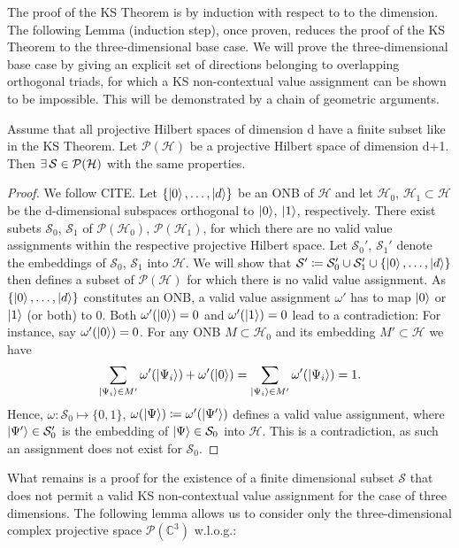 The proof of the KS Theorem is by induction with respect to to the dimension. The following Lemma (induction step), once proven, reduces the proof of the KS Theorem to the three-dimensional base case. We will prove the three-dimensional base case by giving an explicit set of directions belonging to overlapping orthogonal triads, for which a KS non-contextual value assignment can be shown to be impossible. This will be demonstrated by a chain of geometric arguments.

\begin{lemma}[CITE]\hfill\break
Assume that all projective Hilbert spaces of dimension d have a finite subset like in the KS Theorem. Let $\mathcal{P}(\mathcal{H})$ be a projective Hilbert space of dimension d+1. Then $\exists\thinspace\mathbb{\mathcal{S}\in\mathcal{P}}(\mathcal{H})$ with the same properties. 
\end{lemma}

\begin{proof}
We follow CITE. Let $\{\ket{0},\dots,\ket{d} \}$ be an ONB of $\mathcal{H}$ and let $\mathcal{H}_{0}$, $\mathcal{H}_{1}\subset\mathcal{H}$ be the d-dimensional subspaces orthogonal to $\ket{0}$, $\ket{1}$, respectively. There exist subets $\mathcal{S}_{0}$, $\mathcal{S}_{1}$ of $\mathcal{P}(\mathcal{H}_{0})$, $\mathcal{P}(\mathcal{H}_{1})$, for which there are no valid value assignments within the respective projective Hilbert space. Let $\mathcal{S}_{0}'$, $\mathcal{S}_{1}'$ denote the embeddings of $\mathcal{S}_{0}$, $\mathcal{S}_{1}$ into $\mathcal{H}$. We will show that $\mathcal{S}'\coloneqq\mathcal{S}_{0}'\cup\mathcal{S}_{1}'\cup\{\ket{0},\dots, \ket{d}\}$ then defines a subset of $\mathcal{P}(\mathcal{H})$ for which there is no valid value assignment. As $\{\ket{0},\dots,\ket{d} \}$ constitutes an ONB, a valid value assignment $\omega'$ has to map $\ket{0}$ or $\ket{1}$  (or both) to 0. Both $\omega'(\ket{0})=0$ and $\omega'(\ket{1})=0$ lead to a contradiction: For instance, say $\omega'(\ket{0})=0$. For any ONB $M\subset\mathcal{H}_{0}$ and its embedding $M'\subset\mathcal{H}$ we have
\begin{equation*}
\sum\limits _{\ket{\Psi_{i}}\in M'}\omega'(\left|\Psi_{i}\right\rangle )+\omega'(\ket{0} )=\sum\limits _{\ket{\Psi_{i}}\in M'}\omega'(\ket{\Psi_{i}})=1.     
\end{equation*}
Hence, $\omega:\mathcal{S}_{0}\mapsto\{0,1\}$, $\omega(\ket{\Psi} )\coloneqq\omega'(\ket{\Psi'})$ defines a valid value assignment, where $\ket{\Psi'} \in\mathcal{S}_{0}'$ is the embedding of $\ket{\Psi} \in\mathcal{S}_{0}$ into $\mathcal{H}$. This is a contradiction, as such an assignment does not exist for $\mathcal{S}_{0}$.
\end{proof}
What remains is a proof for the existence of a finite dimensional subset $\mathcal{S}$ that does not permit a valid KS non-contextual value assignment for the case of three dimensions. The following lemma allows us to consider only the three-dimensional complex projective space $\mathcal{P}(\mathbb{C}^{3})$ w.l.o.g.:


